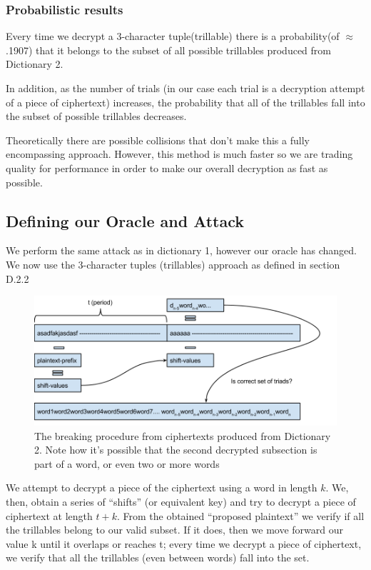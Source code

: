 \documentclass[pdftex,12pt,letter]{article}
\begin{document}
\subsubsection{Probabilistic results}

Every time we decrypt a 3-character tuple(trillable) there is a probability(of
$\approx$ .1907) that it belongs to the subset of all possible trillables
produced from Dictionary 2.

In addition, as the number of trials (in our case each trial is a decryption
attempt of a piece of ciphertext) increases, the probability that all of the
trillables fall into the subset of possible trillables decreases.  

Theoretically there are possible collisions that don't make this a fully
encompassing approach.  However, this method is much faster so we are trading
quality for performance in order to make our overall decryption as fast as
possible.

\subsection{Defining our Oracle and Attack} 

We perform the same attack as in dictionary 1, however our oracle has changed. 
We now use the 3-character tuples (trillables) approach as defined in section D.2.2 
 
\begin{figure}[ht!]
    \centering
    \includegraphics[width=.8\textwidth]{breaking-dict2}
    \caption{The breaking procedure from ciphertexts produced from Dictionary 2. Note
    how it's possible that the second decrypted subsection is part of a word, or even two or more
words}
    \label{breaking-dict1}
\end{figure}

We attempt to decrypt a piece of the ciphertext using a word in length $k$. We,
then, obtain a series of ``shifts'' (or equivalent key) and try to decrypt a
piece of ciphertext at length $t + k$.  From the obtained ``proposed
plaintext'' we verify if all the trillables belong to our valid subset. If it
does, then we move forward our value k until it overlaps or reaches t; every
time we decrypt a piece of ciphertext, we verify that all the trillables (even
between words) fall into the set.
\end{document}

